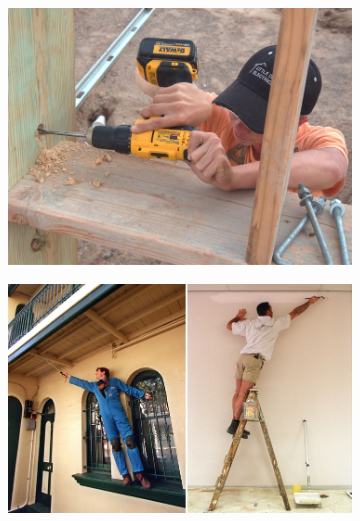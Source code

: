 \documentclass[../thesis.tex]{subfiles}
\begin{document}
\begin{figure}
  \centering
  \begin{subfigure}[b]{0.3\linewidth}
    \includegraphics[width=\linewidth]{./Introduction/Drill.jpg}
  \end{subfigure}
  \hfill
  \begin{subfigure}[b]{0.3\linewidth}
    \includegraphics[width=\linewidth]{./Introduction/ladder.jpg}    
  \end{subfigure}
  \hfill
  \begin{subfigure}[b]{0.3\linewidth}

\end{subfigure}
\end{figure}
\end{document}
